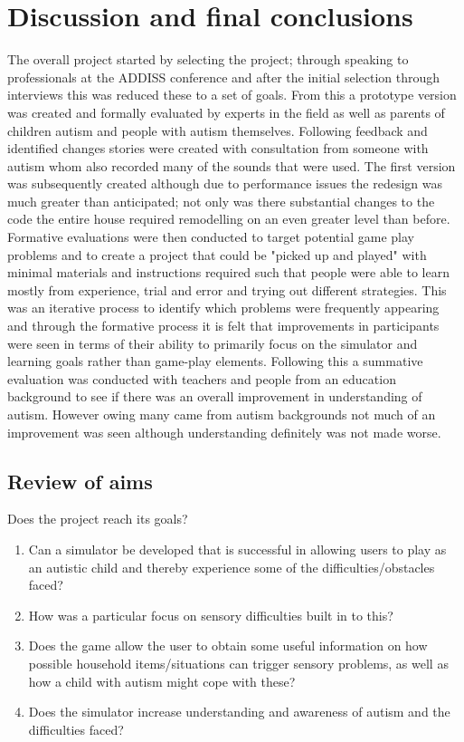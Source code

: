\documentclass[11pt]{report}
\begin{document}
\chapter{Discussion and final conclusions}

The overall project started by selecting the project; through speaking to professionals at the ADDISS conference and after the initial selection through interviews this was reduced these to a set of goals.  
From this a prototype version was created and formally evaluated by experts in the field as well as parents of children autism and people with autism themselves. Following feedback and identified changes stories were created with consultation from someone with autism whom also recorded many of the sounds that were used.
The first version was subsequently created although due to performance issues the redesign was much greater than anticipated; not only was there substantial changes to the code the entire house required remodelling on an even greater level than before. 
Formative evaluations were then conducted to target potential game play problems and to create a project that could be "picked up and played" with minimal materials and instructions required such that people were able to learn mostly from experience, trial and error and trying out different strategies. This was an iterative process to identify which problems were frequently appearing and through the formative process it is felt that improvements in participants were seen in terms of their ability to primarily focus on the simulator and learning goals rather than game-play elements. Following this a summative evaluation was conducted with teachers and people from an education background to see if there was an overall improvement in understanding of autism. However owing many came from autism backgrounds not much of an improvement was seen although understanding definitely was not made worse.

\section{Review of aims}

Does the project reach its goals?
\begin{enumerate}
\item Can a simulator be developed that is successful in allowing users to play as an autistic child and thereby experience some of the difficulties/obstacles faced?
\item How was a particular focus on sensory difficulties built in to this?
\item Does the game allow the user to obtain some useful information on how possible household items/situations can trigger sensory problems, as well as how a child with autism might cope with these?
\item Does the simulator increase understanding and awareness of autism and the difficulties faced?
\end{enumerate}
\end{document}
